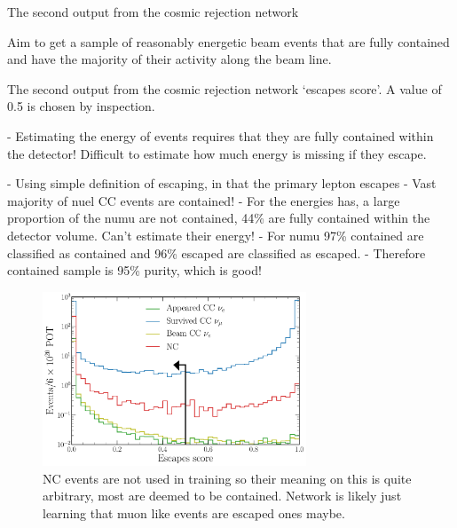 The second output from the cosmic rejection network

Aim to get a sample of reasonably energetic beam events that are fully contained and have the
majority of their activity along the beam line.

The second output from the cosmic rejection network `escapes score'. A value of 0.5 is chosen by
inspection.

- Estimating the energy of events requires that they are fully contained within the detector!
Difficult to estimate how much energy is missing if they escape.

- Using simple definition of escaping, in that the primary lepton escapes
- Vast majority of nuel CC events are contained!
- For the energies \chips has, a large proportion of the numu are not contained, 44\% are fully
contained within the detector volume. Can't estimate their energy!
- For numu 97\% contained are classified as contained and 96\% escaped are classified as escaped.
- Therefore contained sample is 95\% purity, which is good!

\begin{figure} %
    \includegraphics[width=0.7\textwidth]{diagrams/6-cvn/chipsnet/final_escapes_outputs.pdf}
    \caption[final escapes outputs short]
    {NC events are not used in training so their meaning on this is quite arbitrary, most are
        deemed to be contained. Network is likely just learning that muon like events are escaped ones
        maybe.}
    \label{fig:final_escapes_outputs}
\end{figure}


